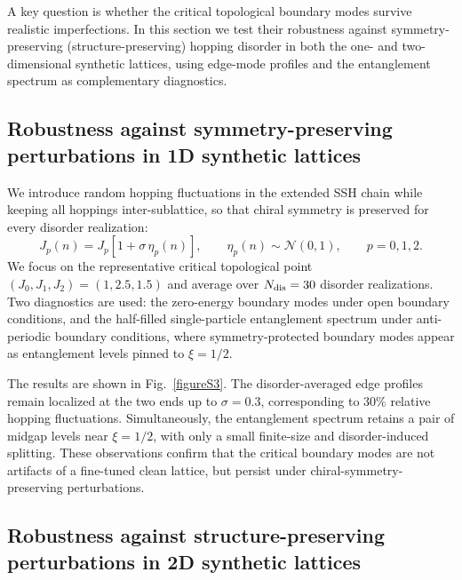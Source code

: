 \documentclass[aps,prl,twocolumn,preprintnumbers,amsmath,amssymb,superscriptaddress,10pt]{revtex4-2}
\begin{document}
A key question is whether the critical topological boundary modes survive realistic imperfections. In this section we test their robustness against symmetry-preserving (structure-preserving) hopping disorder in both the one- and two-dimensional synthetic lattices, using edge-mode profiles and the entanglement spectrum as complementary diagnostics.

\subsection{Robustness against symmetry-preserving perturbations in
1D synthetic lattices}
\label{sec:SM_1D_robustness}

We introduce random hopping fluctuations in the extended SSH chain
while keeping all hoppings inter-sublattice, so that chiral symmetry
is preserved for every disorder realization:
\begin{equation}
J_p(n)=J_p\!\left[1+\sigma\,\eta_p(n)\right],
\qquad
\eta_p(n)\sim\mathcal{N}(0,1),
\qquad p=0,1,2 .
\label{eq:SM_1D_disorder}
\end{equation}
We focus on the representative critical topological point
$(J_0,J_1,J_2)=(1,2.5,1.5)$ and average over $N_{\rm dis}=30$
disorder realizations. Two diagnostics are used: the zero-energy
boundary modes under open boundary conditions, and the half-filled
single-particle entanglement spectrum under anti-periodic boundary
conditions, where symmetry-protected boundary modes appear as
entanglement levels pinned to $\xi=1/2$.

The results are shown in Fig.~\ref{figureS3}. The disorder-averaged edge profiles remain localized at the two ends up to $\sigma=0.3$,
corresponding to $30\%$ relative hopping fluctuations.
Simultaneously, the entanglement spectrum retains a pair of midgap
levels near $\xi=1/2$, with only a small finite-size and
disorder-induced splitting. These observations confirm that the
critical boundary modes are not artifacts of a fine-tuned clean
lattice, but persist under chiral-symmetry-preserving perturbations.

  
\subsection{Robustness against structure-preserving perturbations in 2D synthetic lattices}
\label{sec:SM_2D_robustness}
\end{document}
